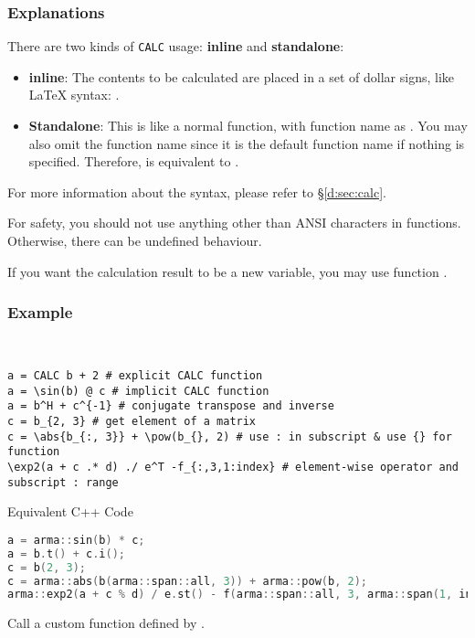 \subsubsection*{Explanations}
There are two kinds of \texttt{CALC} usage: \textbf{inline} and \textbf{standalone}:
\begin{itemize}
  \item \textbf{inline}: The contents to be calculated are placed in a set of dollar signs,
  like \LaTeX{} syntax: .
  \item \textbf{Standalone}: This is like a normal function, with function name as .
  You may also omit the function name  since it is the default function name
  if nothing is specified.
  Therefore,  is equivalent to .
\end{itemize}
For more information about the  syntax,
please refer to \S\ref{d:sec:calc}.
\begin{warning}
  For safety, you should not use anything other than ANSI characters in  functions.
  Otherwise, there can be undefined behaviour.
\end{warning}
If you want the calculation result to be a new variable,
you may use function .
\subsubsection*{Example}
\begin{example}~
  \begin{lstlisting}[language=mmcesim-sim]
a = CALC b + 2 # explicit CALC function
a = \sin(b) @ c # implicit CALC function
a = b^H + c^{-1} # conjugate transpose and inverse
c = b_{2, 3} # get element of a matrix
c = \abs{b_{:, 3}} + \pow(b_{}, 2) # use : in subscript & use {} for function
\exp2(a + c .* d) ./ e^T -f_{:,3,1:index} # element-wise operator and subscript : range
  \end{lstlisting}
  Equivalent C++ Code
  \begin{lstlisting}[language=c++,morekeywords={sin,abs,exp2,pow}]
a = arma::sin(b) * c;
a = b.t() + c.i();
c = b(2, 3);
c = arma::abs(b(arma::span::all, 3)) + arma::pow(b, 2);
arma::exp2(a + c % d) / e.st() - f(arma::span::all, 3, arma::span(1, index));
  \end{lstlisting}
\end{example}

Call a custom function defined by .

